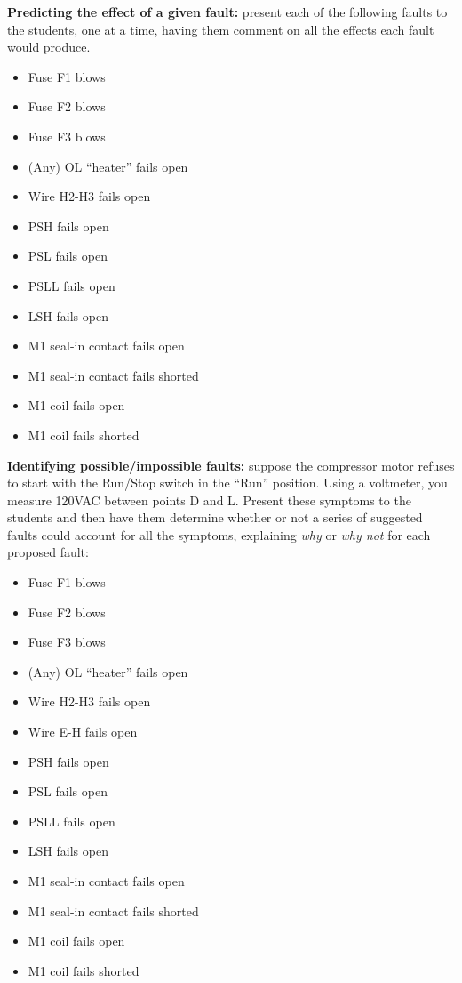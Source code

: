 \noindent
{\bf Predicting the effect of a given fault:} present each of the following faults to the students, one at a time, having them comment on all the effects each fault would produce.

\begin{itemize}
\item{} Fuse F1 blows
\item{} Fuse F2 blows
\item{} Fuse F3 blows
\item{} (Any) OL ``heater'' fails open
\item{} Wire H2-H3 fails open
\item{} PSH fails open
\item{} PSL fails open
\item{} PSLL fails open
\item{} LSH fails open
\item{} M1 seal-in contact fails open
\item{} M1 seal-in contact fails shorted
\item{} M1 coil fails open
\item{} M1 coil fails shorted
\end{itemize}


\vskip 10pt


\noindent
{\bf Identifying possible/impossible faults:} suppose the compressor motor refuses to start with the Run/Stop switch in the ``Run'' position.  Using a voltmeter, you measure 120VAC between points D and L.  Present these symptoms to the students and then have them determine whether or not a series of suggested faults could account for all the symptoms, explaining {\it why} or {\it why not} for each proposed fault:

\begin{itemize}
\item{} Fuse F1 blows
\item{} Fuse F2 blows
\item{} Fuse F3 blows
\item{} (Any) OL ``heater'' fails open
\item{} Wire H2-H3 fails open
\item{} Wire E-H fails open
\item{} PSH fails open 
\item{} PSL fails open
\item{} PSLL fails open
\item{} LSH fails open
\item{} M1 seal-in contact fails open
\item{} M1 seal-in contact fails shorted
\item{} M1 coil fails open
\item{} M1 coil fails shorted
\end{itemize}


